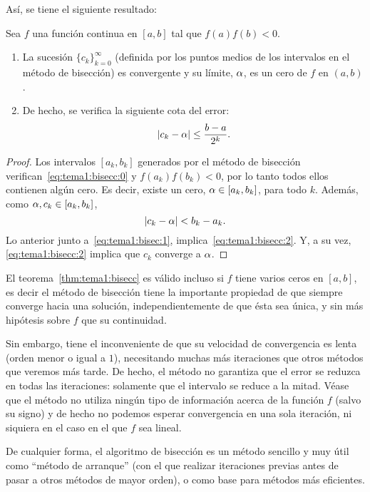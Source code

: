 Así, se tiene el siguiente resultado:
\begin{theorem}
  \label{thm:tema1:bisecc}
  Sea $f$ una función continua en $[a,b]$ tal que $f(a)f(b)<0$.
  \begin{enumerate}
  \item La sucesión $\{c_k\}_{k=0}^\infty$ (definida por los puntos
    medios de los intervalos en el método de bisección) es convergente
    y su límite, $\alpha$, es un cero de $f$ en $(a,b)$.
  \item De hecho, se verifica la siguiente cota del error:
    \begin{equation}
      \label{eq:tema1:bisecc:2}
      |c_k-\alpha| \le \frac{b-a}{2^k}.
    \end{equation}
  \end{enumerate}
\end{theorem}

\begin{proof}
  Los intervalos $[a_k,b_k]$ generados por el método de bisección
  verifican~\eqref{eq:tema1:bisecc:0} y $f(a_k)f(b_k)<0$, por lo tanto
  todos ellos contienen algún cero. Es decir, existe un cero,
  $\alpha\in [a_k,b_k]$, para todo $k$. Además, como
  $\alpha, c_k \in [a_k,b_k]$,
  $$
  |c_k - \alpha| < b_k - a_k.
  $$
  Lo anterior junto a~\eqref{eq:tema1:bisec:1},
  implica~\eqref{eq:tema1:bisecc:2}. Y, a su vez,
  \eqref{eq:tema1:bisecc:2} implica que $c_k$ converge a $\alpha$.
\end{proof}

\begin{remark}
  \label{rk:tema1:unicidad-bisecc}
  El teorema~\ref{thm:tema1:bisecc} es válido incluso si $f$ tiene
  varios ceros en $[a,b]$, es decir el método de bisección tiene la
  importante propiedad de que siempre converge hacia una solución,
  independientemente de que ésta sea única, y sin más hipótesis sobre
  $f$ que su continuidad.

  Sin embargo, tiene el inconveniente de que su velocidad de
  convergencia es lenta (orden menor o igual a $1$), necesitando
  muchas más iteraciones que otros métodos que veremos más tarde. De
  hecho, el método no garantiza que el error se reduzca en todas las
  iteraciones: solamente que el intervalo se reduce a la mitad. Véase
  que el método no utiliza ningún tipo de información acerca de la
  función $f$ (salvo su signo) y de hecho no podemos esperar
  convergencia en una sola iteración, ni siquiera en el caso en el que
  $f$ sea lineal.

  De cualquier forma, el algoritmo de bisección es un método sencillo y
  muy útil como ``método de arranque'' (con el que realizar iteraciones
  previas antes de pasar a otros métodos de mayor orden), o como base
  para métodos más eficientes.
\end{remark}

